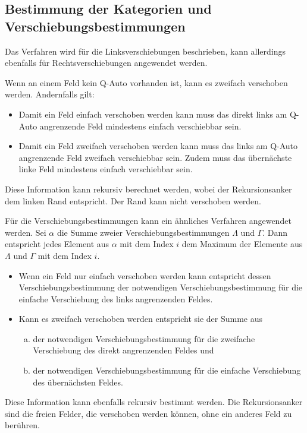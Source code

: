 \documentclass[a4paper,10pt,ngerman]{scrartcl}
\begin{document}
\subsection{Bestimmung der Kategorien und Verschiebungsbestimmungen}
Das Verfahren wird für die Linksverschiebungen beschrieben, kann allerdings ebenfalls für Rechtsverschiebungen angewendet werden.

Wenn an einem Feld kein Q-Auto vorhanden ist, kann es zweifach verschoben werden.
Andernfalls gilt:
\begin{itemize}
    \item Damit ein Feld einfach verschoben werden kann muss das direkt links am Q-Auto angrenzende Feld mindestens einfach verschiebbar sein.
    \item Damit ein Feld zweifach verschoben werden kann muss das links am Q-Auto angrenzende Feld zweifach verschiebbar sein.
          Zudem muss das übernächste linke Feld mindestens einfach verschiebbar sein.
\end{itemize}
Diese Information kann rekursiv berechnet werden, wobei der Rekursionsanker dem linken Rand entspricht.
Der Rand kann nicht verschoben werden.

Für die Verschiebungsbestimmungen kann ein ähnliches Verfahren angewendet werden.
Sei $\alpha$ die Summe zweier Verschiebungsbestimmungen $\Lambda$ und $\Gamma$.
Dann entspricht jedes Element aus $\alpha$ mit dem Index $i$ dem Maximum der Elemente aus $\Lambda$ und $\Gamma$ mit dem Index $i$.

\begin{itemize}
    \item Wenn ein Feld nur einfach verschoben werden kann entspricht dessen Verschiebungsbestimmung der notwendigen Verschiebungsbestimmung für die einfache Verschiebung des links angrenzenden Feldes.
    \item Kann es zweifach verschoben werden entspricht sie der Summe aus
          \begin{enumerate}[a)]
              \item der notwendigen Verschiebungsbestimmung für die zweifache Verschiebung des direkt angrenzenden Feldes und
              \item der notwendigen Verschiebungsbestimmung für die einfache Verschiebung des übernächsten Feldes.
          \end{enumerate}
\end{itemize}
Diese Information kann ebenfalls rekursiv bestimmt werden.
Die Rekursionsanker sind die freien Felder, die verschoben werden können, ohne ein anderes Feld zu berühren.
\end{document}
